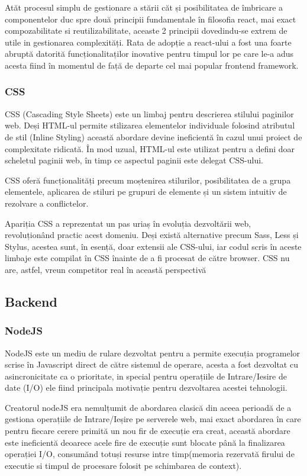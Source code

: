 \documentclass[12pt,a4paper,hidelinks]{report}
\theoremstyle{definition}
\theoremstyle{remark}
\begin{document}
Atăt procesul simplu de gestionare a stării căt și
posibilitatea de îmbricare a componentelor duc spre două principii fundamentale în filosofia react,
mai exact compozabilitate si reutilizabilitate, aceaste 2 principii dovedindu-se extrem de utile in gestionarea complexități.
Rata de adopție a react-ului a fost una foarte abruptă datorită funcționalitaților inovative pentru timpul lor pe care le-a adus acesta
fiind în momentul de față de departe cel mai popular frontend framework.

\subsubsection{CSS}

CSS (Cascading Style Sheets) este un limbaj pentru descrierea stilului paginilor web. Deși HTML-ul permite stilizarea elementelor individuale folosind atributul de stil (Inline Styling) 
această abordare devine ineficientă în cazul unui proiect de complexitate ridicată. În mod uzual, HTML-ul este utilizat pentru a defini doar scheletul paginii web, 
în timp ce aspectul paginii este delegat CSS-ului. 

CSS oferă funcționalități precum moștenirea stilurilor, posibilitatea de a grupa elementele, aplicarea de stiluri pe grupuri de elemente și un sistem intuitiv de rezolvare a conflictelor. 

Apariția CSS a reprezentat un pas uriaș în evoluția dezvoltării web, revoluționând practic acest domeniu. Deși există alternative precum Sass, 
Less și Stylus, acestea sunt, în esență, doar extensii ale CSS-ului, iar codul scris în aceste limbaje este compilat în CSS înainte de a fi procesat de către browser. 
CSS nu are, astfel, vreun competitor real în această perspectivă

\subsection{Backend}
\subsubsection{NodeJS}
NodeJS este un mediu de rulare dezvoltat pentru a permite execuția programelor scrise în Javascript direct de către sistemul de operare, acesta a fost dezvoltat cu asincronicitate ca o prioritate,
in special pentru operațiile de Intrare/Iesire de date (I/O) ele fiind principala motivație pentru dezvoltarea acestei tehnologii.

Creatorul nodeJS era nemulțumit de abordarea clasică din aceea perioadă de a gestiona operațiile de Intrare/Ieșire pe serverele web, mai exact abordarea în care pentru fiecare cerere primită un nou fir de execuție era creat, 
această abordare este ineficientă deoarece acele fire de execuție sunt blocate până la finalizarea operației I/O,
consumănd totuși resurse intre timp(memoria rezervată firului de executie si timpul de procesare folosit pe schimbarea de context). 
\end{document}
